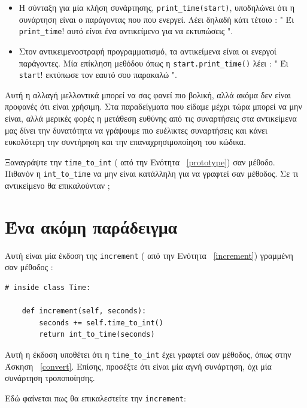 \documentclass[10pt]{book}
\begin{document}
\begin{itemize}

 
\item Η σύνταξη για μία κλήση συνάρτησης,  \verb"print_time(start)",  υποδηλώνει ότι η συνάρτηση είναι ο παράγοντας που   
  που ενεργεί.  Λέει δηλαδή κάτι τέτοιο : " Έι  \verb"print_time"!  αυτό είναι ένα αντικείμενο για να 
  εκτυπώσεις ". 

\item Στον αντικειμενοστραφή προγραμματισμό, τα αντικείμενα είναι οι ενεργοί παράγοντες.  Μία επίκληση μεθόδου όπως η  
  \verb"start.print_time()"  λέει : " Έι  {\tt start}!  εκτύπωσε τον εαυτό σου παρακαλώ ".

\end{itemize}

 Αυτή η αλλαγή μελλοντικά μπορεί να σας φανεί πιο βολική, αλλά ακόμα δεν είναι προφανές ότι είναι χρήσιμη.  Στα παραδείγματα που είδαμε μέχρι τώρα μπορεί να μην είναι, αλλά μερικές φορές η μετάθεση ευθύνης από τις συναρτήσεις στα αντικείμενα μας δίνει την δυνατότητα να γράψουμε πιο ευέλικτες συναρτήσεις και κάνει ευκολότερη την συντήρηση και την επαναχρησιμοποίηση του κώδικα.

\begin{exercise}
\label{convert}

Ξαναγράψτε την  \verb"time_to_int" ( από την Ενότητα~ \ref{prototype})  σαν μέθοδο.  Πιθανόν η  \verb"int_to_time"  να μην είναι κατάλληλη για να γραφτεί σαν μέθοδος. Σε τι αντικείμενο θα επικαλούνταν ;
\end{exercise}


 
\section{Ένα ακόμη παράδειγμα}

Αυτή είναι μία έκδοση της  {\tt increment} ( από την Ενότητα~ \ref{increment})  γραμμένη σαν μέθοδος :

\begin{verbatim}
# inside class Time:

    def increment(self, seconds):
        seconds += self.time_to_int()
        return int_to_time(seconds)
\end{verbatim}
%
 Αυτή η έκδοση υποθέτει ότι η  \verb"time_to_int"  έχει γραφτεί σαν μέθοδος, όπως στην Άσκηση~ \ref{convert}.   Επίσης, προσέξτε ότι είναι μία αγνή συνάρτηση, όχι μία 
συνάρτηση τροποποίησης. 

Εδώ φαίνεται πως θα επικαλεστείτε την  {\tt increment}:
\end{document}
